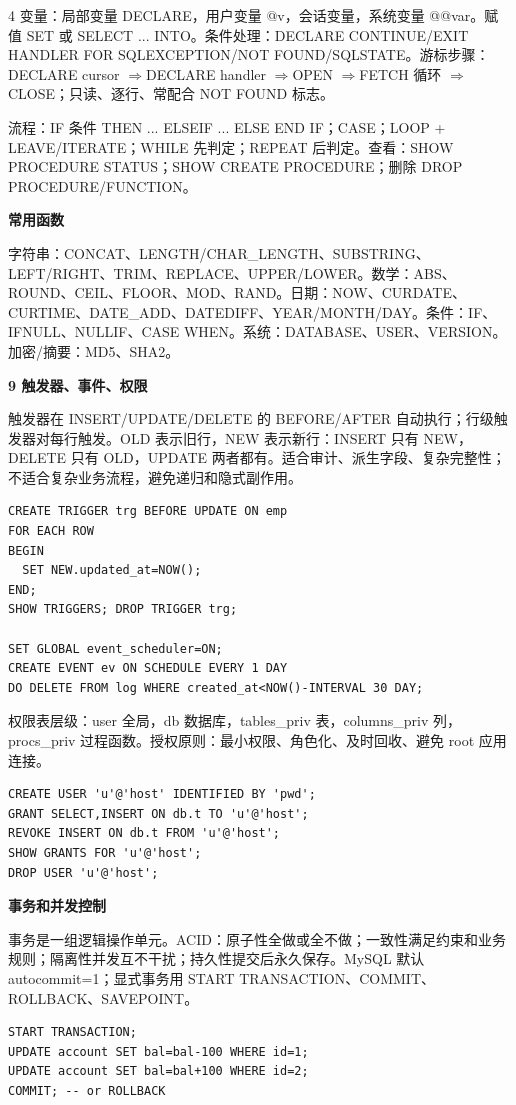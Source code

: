 \documentclass[UTF8]{ctexart}
\newcommand{\blk}[1]{\vspace{0.8pt}\noindent\colorbox{black!10}{\parbox{\dimexpr\linewidth-2\fboxsep}{\bfseries #1}}\vspace{0.6pt}}
\newcommand{\tri}{$\Rightarrow$}
\begin{document}
\begin{multicols*}{4}
变量：局部变量 DECLARE，用户变量 @v，会话变量，系统变量 @@var。赋值 SET 或 SELECT ... INTO。条件处理：DECLARE CONTINUE/EXIT HANDLER FOR SQLEXCEPTION/NOT FOUND/SQLSTATE。游标步骤：DECLARE cursor \tri DECLARE handler \tri OPEN \tri FETCH 循环 \tri CLOSE；只读、逐行、常配合 NOT FOUND 标志。

流程：IF 条件 THEN ... ELSEIF ... ELSE END IF；CASE；LOOP + LEAVE/ITERATE；WHILE 先判定；REPEAT 后判定。查看：SHOW PROCEDURE STATUS；SHOW CREATE PROCEDURE；删除 DROP PROCEDURE/FUNCTION。

\blk{常用函数}
字符串：CONCAT、LENGTH/CHAR\_LENGTH、SUBSTRING、LEFT/RIGHT、TRIM、REPLACE、UPPER/LOWER。数学：ABS、ROUND、CEIL、FLOOR、MOD、RAND。日期：NOW、CURDATE、CURTIME、DATE\_ADD、DATEDIFF、YEAR/MONTH/DAY。条件：IF、IFNULL、NULLIF、CASE WHEN。系统：DATABASE、USER、VERSION。加密/摘要：MD5、SHA2。

\blk{9 触发器、事件、权限}
触发器在 INSERT/UPDATE/DELETE 的 BEFORE/AFTER 自动执行；行级触发器对每行触发。OLD 表示旧行，NEW 表示新行：INSERT 只有 NEW，DELETE 只有 OLD，UPDATE 两者都有。适合审计、派生字段、复杂完整性；不适合复杂业务流程，避免递归和隐式副作用。

\begin{lstlisting}
CREATE TRIGGER trg BEFORE UPDATE ON emp
FOR EACH ROW
BEGIN
  SET NEW.updated_at=NOW();
END;
SHOW TRIGGERS; DROP TRIGGER trg;

SET GLOBAL event_scheduler=ON;
CREATE EVENT ev ON SCHEDULE EVERY 1 DAY
DO DELETE FROM log WHERE created_at<NOW()-INTERVAL 30 DAY;
\end{lstlisting}

权限表层级：user 全局，db 数据库，tables\_priv 表，columns\_priv 列，procs\_priv 过程函数。授权原则：最小权限、角色化、及时回收、避免 root 应用连接。

\begin{lstlisting}
CREATE USER 'u'@'host' IDENTIFIED BY 'pwd';
GRANT SELECT,INSERT ON db.t TO 'u'@'host';
REVOKE INSERT ON db.t FROM 'u'@'host';
SHOW GRANTS FOR 'u'@'host';
DROP USER 'u'@'host';
\end{lstlisting}

\blk{事务和并发控制}
事务是一组逻辑操作单元。ACID：原子性全做或全不做；一致性满足约束和业务规则；隔离性并发互不干扰；持久性提交后永久保存。MySQL 默认 autocommit=1；显式事务用 START TRANSACTION、COMMIT、ROLLBACK、SAVEPOINT。

\begin{lstlisting}
START TRANSACTION;
UPDATE account SET bal=bal-100 WHERE id=1;
UPDATE account SET bal=bal+100 WHERE id=2;
COMMIT; -- or ROLLBACK
\end{lstlisting}


\end{multicols*}
\end{document}
